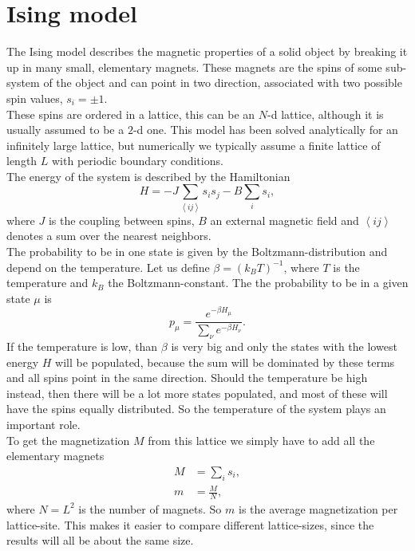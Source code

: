 \section{Ising model}

The Ising model describes the magnetic properties of a solid object by breaking it up in many small, elementary magnets. These magnets are the spins of some sub-system of the object and can point in two direction, associated with two possible spin values, $s_i = \pm 1$.\\
These spins are ordered in a lattice, this can be an $N$-d lattice, although it is usually assumed to be a $2$-d one. This model has been solved analytically for an infinitely large lattice, but numerically we typically assume a finite lattice of length $L$ with periodic boundary conditions.\\
The energy of the system is described by the Hamiltonian
\begin{equation}
H = - J \sum_{\left\langle i j \right\rangle} s_i s_j - B \sum_i s_i,
\end{equation}
where $J$ is the coupling between spins, $B$ an external magnetic field and $\left\langle i j \right\rangle$ denotes a sum over the nearest neighbors.\\
The probability to be in one state is given by the Boltzmann-distribution and depend on the temperature. Let us define $\beta = {(k_B T)}^{-1}$, where $T$ is the temperature and $k_B$ the Boltzmann-constant. The the probability to be in a given state $\mu$ is
\begin{equation}
 p_{\mu} = \frac{e^{- \beta H_{\mu}}}{\sum_{\nu} e^{- \beta H_{\nu}}}.
\end{equation}
If the temperature is low, than $\beta$ is very big and only the states with the lowest energy $H$ will be populated, because the sum will be dominated by these terms and all spins point in the same direction. Should the temperature be high instead, then there will be a lot more states populated, and most of these will have the spins equally distributed. So the temperature of the system plays an important role.\\
To get the magnetization $M$ from this lattice we simply have to add all the elementary magnets
\begin{align}
M & = \sum_i s_i, \\
m & = \frac{M}{N},
\end{align}
where $N = L^2$ is the number of magnets. So $m$ is the average magnetization per lattice-site. This makes it easier to compare different lattice-sizes, since the results will all be about the same size.\\
